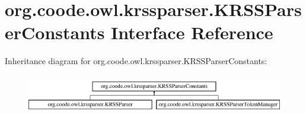 \hypertarget{interfaceorg_1_1coode_1_1owl_1_1krssparser_1_1_k_r_s_s_parser_constants}{\section{org.\-coode.\-owl.\-krssparser.\-K\-R\-S\-S\-Parser\-Constants Interface Reference}
\label{interfaceorg_1_1coode_1_1owl_1_1krssparser_1_1_k_r_s_s_parser_constants}
}
Inheritance diagram for org.\-coode.\-owl.\-krssparser.\-K\-R\-S\-S\-Parser\-Constants\-:\begin{figure}[H]
\begin{center}
\leavevmode
\includegraphics[height=1.728395cm]{interfaceorg_1_1coode_1_1owl_1_1krssparser_1_1_k_r_s_s_parser_constants}
\end{center}
\end{figure}
